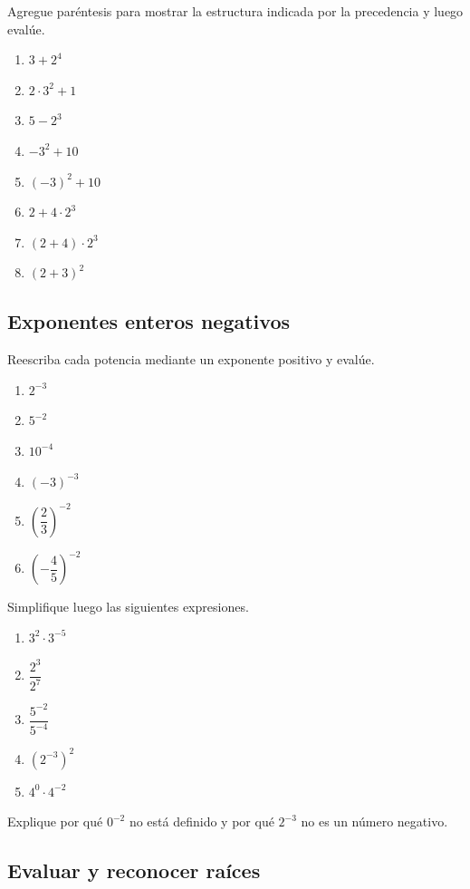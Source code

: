Agregue paréntesis para mostrar la estructura indicada por la precedencia y luego evalúe.

\begin{enumerate}
\item \(3+2^4\)
\item \(2\cdot3^2+1\)
\item \(5-2^3\)
\item \(-3^2+10\)
\item \((-3)^2+10\)
\item \(2+4\cdot2^3\)
\item \((2+4)\cdot2^3\)
\item \((2+3)^2\)
\end{enumerate}

\subsection*{Exponentes enteros negativos}

Reescriba cada potencia mediante un exponente positivo y evalúe.

\begin{enumerate}
\item \(2^{-3}\)
\item \(5^{-2}\)
\item \(10^{-4}\)
\item \((-3)^{-3}\)
\item \(\left(\dfrac23\right)^{-2}\)
\item \(\left(-\dfrac45\right)^{-2}\)
\end{enumerate}

Simplifique luego las siguientes expresiones.

\begin{enumerate}
\item \(3^2\cdot3^{-5}\)
\item \(\dfrac{2^3}{2^7}\)
\item \(\dfrac{5^{-2}}{5^{-4}}\)
\item \((2^{-3})^2\)
\item \(4^0\cdot4^{-2}\)
\end{enumerate}

Explique por qué \(0^{-2}\) no está definido y por qué \(2^{-3}\) no es un número negativo.

\subsection*{Evaluar y reconocer raíces}

